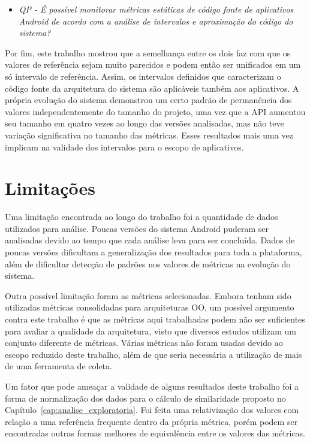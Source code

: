 \begin{itemize}
\item \textit{QP - É possível monitorar métricas estáticas de código fonte de aplicativos Android de acordo com a análise de intervalos e aproximação do código do sistema?}
\end{itemize}

Por fim, este trabalho mostrou que a semelhança entre os dois faz com que os valores de referência sejam muito parecidos e podem então ser unificados em um só intervalo de referência. Assim, os intervalos definidos que caracterizam o código fonte da arquitetura do sistema são aplicáveis também aos aplicativos. A própria evolução do sistema demonstrou um certo padrão de permanência dos valores independentemente do tamanho do projeto, uma vez que a API aumentou seu tamanho em quatro vezes ao longo das versões analisadas, mas não teve variação significativa no tamanho das métricas. Esses resultados mais uma vez implicam na validade dos intervalos para o escopo de aplicativos.

\section{Limitações}

Uma limitação encontrada ao longo do trabalho foi a quantidade de dados utilizados para análise. Poucas versões do sistema Android puderam ser analisadas devido ao tempo que cada análise leva para ser concluída. Dados de poucas versões dificultam a generalização dos resultados para toda a plataforma, além de dificultar detecção de padrões nos valores de métricas na evolução do sistema.

Outra possível limitação foram as métricas selecionadas. Embora tenham sido utilizadas métricas consolidadas para arquiteturas OO, um possível argumento contra este trabalho é que as métricas aqui trabalhadas podem não ser suficientes para avaliar a qualidade da arquitetura, visto que diversos estudos utilizam um conjunto diferente de métricas. Várias métricas não foram usadas devido ao escopo reduzido deste trabalho, além de que seria necessária a utilização de mais de uma ferramenta de coleta.

Um fator que pode ameaçar a validade de alguns resultados deste trabalho foi a forma de normalização dos dados para o cálculo de similaridade proposto no Capítulo~\ref{cap:analise_exploratoria}. Foi feita uma relativização dos valores com relação a uma referência frequente dentro da própria métrica, porém podem ser encontradas outras formas melhores de equivalência entre os valores das métricas.

